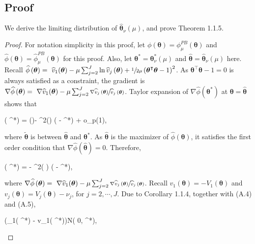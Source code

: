 \documentclass[12pt]{article}
\newcommand{\wh}{\widehat}
\newcommand{\itl}{\intercal}
\newcommand{\bs}{ \boldsymbol}
\newcommand{\lt}{\left}
\newcommand{\rt}{\right}
\begin{document}
\subsection{Proof}
We derive the limiting distribution of $\widehat{\bs{\theta}}_{\nu}(\mu)$, and prove Theorem 1.1.5.
\begin{proof} For notation simplicity in this proof, let $\phi\lt(\bs{\theta}\rt) = \phi^{PB}_{\mu}\lt(\bs{\theta}\rt)$ and $\wh{\phi}(\bs{\theta}) = \wh{\phi}^{PB}_{\mu}\lt(\bs{\theta}\rt)$ for this proof. Also, let $\bs{\theta}^* = \bs{\theta}^*_{\nu}(\mu)$ and $\wh{\bs{\theta}} = \wh{\bs{\theta}}_{\nu}(\mu)$ here.
	Recall $\wh{\phi}\lt(\bs{\theta}\rt) = \,\,\wh{v}_1(\bs{\theta}) - \mu \sum_{j=2}^J \ln \wh{v}_j\lt( \bs{\theta}\rt) + \sfrac{1}{2\mu} \lt(\bs{\theta}^{\itl}\bs{\theta} - 1\rt)^2$.  As  $\bs{\theta}^{\itl}\bs{\theta}-1=0$ is always satisfied as a constraint, the gradient is $\nabla\wh{\phi}\lt(\bs{\theta}\rt) = \,\,\nabla\wh{v}_1(\bs{\theta}) - \mu \sum_{j=2}^J \sfrac{\nabla\wh{v}_j\lt( \bs{\theta}\rt)}{\wh{v}_j\lt( \bs{\theta}\rt)}$. Taylor expansion of $\nabla\wh{\phi}\lt(\bs{\theta}^*\rt)$ at $\bs{\theta} = \widehat{\bs{\theta}}$ shows that
	\begin{flalign*}
	\nabla\wh{\phi}\lt(\bs{\theta}^*\rt) =  \nabla\wh{\phi}(\wh{\bs{\theta}})- \nabla^2\wh{\phi}(\tilde{\bs{\theta}}) (\widehat{\bs{\theta}} - \bs{\theta}^{*}) + o_p(1),
	\end{flalign*}
	where $\tilde{\bs{\theta}}$ is between $\wh{\bs{\theta}}$ and $\bs{\theta}^*$. As $\widehat{\bs{\theta}}$ is the maximizer of $\widehat{\phi}\lt(\bs{\theta}\rt)$, it satisfies the first order condition that $\nabla \wh{\phi}(\widehat{\bs{\theta}}) = 0$. Therefore, 
	\begin{flalign}
	\nabla\wh{\phi}\lt(\bs{\theta}^*\rt) =   -  \nabla^2\wh{\phi}( \tilde{\bs{\theta}}) (\widehat{\bs{\theta}} - \bs{\theta}^{*}),
	\end{flalign}
	where $\nabla\wh{\phi}\lt(\bs{\theta}\rt) = \,\,\nabla\wh{v}_1(\bs{\theta}) - \mu \sum_{j=2}^J \sfrac{\nabla\wh{v}_j\lt( \bs{\theta}\rt)}{\wh{v}_j\lt( \bs{\theta}\rt)}$.
	Recall $v_1\lt(\bs{\theta}\rt)=- V_1\lt(\bs{\theta}\rt)$ and  $v_j\lt(\bs{\theta}\rt) = V_j\lt(\bs{\theta}\rt) - \nu_j$, for $j = 2, \cdots, J$.  Due to Corollary 1.1.4, together with (A.4) and (A.5),
	\begin{flalign}
	\bigg(\nabla\wh{v}_1(\bs{\theta}^*) - \nabla v_1(\bs{\theta}^*)\bigg)N\lt( 0, \bs{C}^*\rt),
	\end{flalign}
	

\end{proof}
\end{document}
